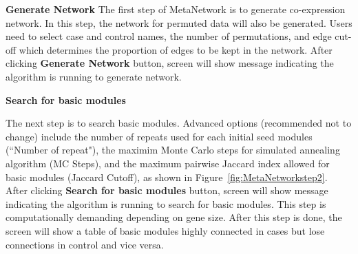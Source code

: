 \begin{steps}
\item \textbf{Generate Network}
The first step of MetaNetwork is to generate co-expression network. 
In this step, the network for permuted data will also be generated. 
Users need to select case and control names, the number of permutations, and edge cut-off which determines the proportion of edges to be kept in the network. 
After clicking \textbf{Generate Network} button, screen will show message indicating the algorithm is running to generate network.


\item \textbf{Search for basic modules}

The next step is to search basic modules.
Advanced options (recommended not to change) include the number of repeats used for each initial seed modules (``Number of repeat"),
the maximim Monte Carlo steps for simulated annealing algorithm (MC Steps),
and the maximum pairwise Jaccard index allowed for basic modules (Jaccard Cutoff), as shown in Figure~\ref{fig:MetaNetworkstep2}.
After clicking \textbf{Search for basic modules} button, screen will show message indicating the algorithm is running to search for basic modules.
This step is computationally demanding depending on gene size.
After this step is done,
the screen will show a table of basic modules highly connected in cases but lose connections in control and vice versa.


\end{steps}
